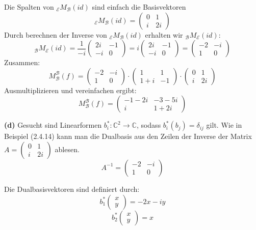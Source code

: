 \documentclass[a4paper,12pt]{article}
\begin{document}
Die Spalten von ${}_{\mathcal{E}}M_{\mathcal{B}}(id)$ sind einfach die Basisvektoren \\
$$ {}_{\mathcal{E}}M_{\mathcal{B}}(id)= \begin{pmatrix} 0 & 1 \\ i & 2i \end{pmatrix}$$
Durch berechnen der Inverse von ${}_{\mathcal{E}}M_{\mathcal{B}}(id)$ erhalten wir ${}_{\mathcal{B}}M_{\mathcal{E}}(id)$:
$${}_{\mathcal{B}}M_{\mathcal{E}}(id) = \frac{1}{-i} \begin{pmatrix} 2i & -1 \\ -i & 0 \end{pmatrix} = i \begin{pmatrix} 2i & -1 \\ -i & 0 \end{pmatrix} = \begin{pmatrix} -2 & -i \\ 1 & 0 \end{pmatrix}$$
Zusammen: \\
$$M_\mathcal{B}^\mathcal{B}(f) = \begin{pmatrix} -2 & -i \\ 1 & 0 \end{pmatrix} \cdot \begin{pmatrix} 1 & 1 \\ 1+i & -1 \end{pmatrix} \cdot \begin{pmatrix} 0 & 1 \\ i & 2i \end{pmatrix}$$
Ausmultiplizieren und vereinfachen ergibt:
$$ M_\mathcal{B}^\mathcal{B}(f)= \begin{pmatrix} -1 - 2i & -3 - 5i \\ i & 1 + 2i \end{pmatrix}$$


\bigskip
\noindent\textbf{(d)} 
Gesucht sind Linearformen $b_i^*: \mathbb{C}^2 \to \mathbb{C}$, sodass $b_i^*(b_j) = \delta_{ij}$ gilt. Wie in Beispiel (2.4.14) kann man die Dualbasis aus den Zeilen der Inverse der  Matrix 
$A = \begin{pmatrix} 0 & 1 \\ i & 2i \end{pmatrix}$ ablesen.
$$A^{-1} = \begin{pmatrix} -2 & -i \\ 1 & 0 \end{pmatrix}$$ 

Die Dualbasisvektoren sind definiert durch:
$$b_1^*\begin{pmatrix} x \\ y \end{pmatrix} = -2x - iy$$
$$b_2^*\begin{pmatrix} x \\ y \end{pmatrix} = x$$
\end{document}

